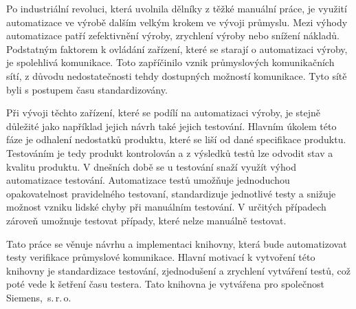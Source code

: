 \begin{introduction}
Po industriální revoluci, která uvolnila dělníky z těžké manuální práce, je využití automatizace ve výrobě dalším velkým krokem ve vývoji průmyslu. 
Mezi výhody automatizace patří zefektivnění výroby, zrychlení výroby nebo snížení nákladů. Podstatným faktorem k ovládání zařízení, které se starají o automatizaci výroby, je spolehlivá komunikace. Toto zapříčinilo vznik průmyslových komunikačních sítí, z důvodu nedostatečnosti tehdy dostupných možností komunikace. Tyto sítě byli s postupem času standardizovány.

Při vývoji těchto zařízení, které se podílí na automatizaci výroby, je stejně důležité jako například jejich návrh také jejich testování. Hlavním úkolem této fáze je odhalení nedostatků produktu, které se liší od dané specifikace produktu. Testováním je tedy produkt kontrolován a z výsledků testů lze odvodit stav a kvalitu produktu. V dnešních době se u testování snaží využít výhod automatizace testování. Automatizace testů umožňuje jednoduchou opakovatelnost pravidelného testovaní, standardizuje jednotlivé testy a snižuje možnost vzniku lidské chyby při manuálním testování. V určitých případech zároveň umožnuje testovat případy, které nelze manuálně testovat.

Tato práce se věnuje návrhu a implementaci knihovny, která bude automatizovat testy verifikace průmyslové komunikace. Hlavní motivací k vytvoření této knihovny je standardizace testování, zjednodušení a zrychlení vytváření testů, což poté vede k šetření času testera. Tato knihovna je vytvářena pro společnost Siemens,~s.\,{}r.\,{}o.

\end{introduction}
